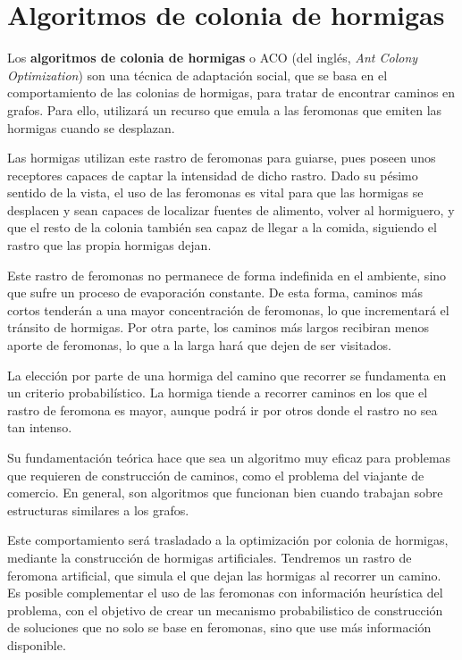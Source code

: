 \section{Algoritmos de colonia de hormigas}

Los \textbf{algoritmos de colonia de hormigas} o ACO (del inglés, \textit{Ant Colony Optimization})
son una técnica de adaptación social, que se basa en el comportamiento de las colonias de
hormigas, para tratar de encontrar caminos en grafos. Para ello, utilizará un recurso
que emula a las feromonas que emiten las hormigas cuando se desplazan.

Las hormigas utilizan este rastro de feromonas para guiarse, pues poseen unos receptores
capaces de captar la intensidad de dicho rastro. Dado su pésimo sentido de la vista,
el uso de las feromonas es vital para que las hormigas se desplacen y sean capaces de
localizar fuentes de alimento, volver al hormiguero, y que el resto de la colonia también
sea capaz de llegar a la comida, siguiendo el rastro que las propia hormigas dejan.

Este rastro de feromonas no permanece de forma indefinida en el ambiente, sino que
sufre un proceso de evaporación constante. De esta forma, caminos más cortos tenderán
a una mayor concentración de feromonas, lo que incrementará el tránsito de hormigas.
Por otra parte, los caminos más largos recibiran menos aporte de feromonas, lo que a
la larga hará que dejen de ser visitados.

La elección por parte de una hormiga del camino que recorrer se fundamenta en un
criterio probabilístico. La hormiga tiende a recorrer caminos en los que el rastro
de feromona es mayor, aunque podrá ir por otros donde el rastro no sea tan intenso.

Su fundamentación teórica hace que sea un algoritmo muy eficaz para problemas que
requieren de construcción de caminos, como el problema del viajante de comercio.
En general, son algoritmos que funcionan bien cuando trabajan sobre estructuras
similares a los grafos.

Este comportamiento será trasladado a la optimización por colonia de hormigas,
mediante la construcción de hormigas artificiales. Tendremos un rastro de feromona
artificial, que simula el que dejan las hormigas al recorrer un camino. Es posible
complementar el uso de las feromonas con información heurística del problema,
con el objetivo de crear un mecanismo probabilistico de construcción de soluciones
que no solo se base en feromonas, sino que use más información disponible.

